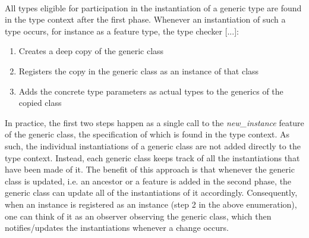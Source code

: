 \paragraph{} All types eligible for participation in the instantiation of a generic type are found in the type context after the first phase. Whenever an instantiation of such a type occurs, for instance as a feature type, the type checker [...]:
\begin{enumerate}
\item Creates a deep copy of the generic class
\item Registers the copy in the generic class as an instance of that class
\item Adds the concrete type parameters as actual types to the generics of the copied class
\end{enumerate}
In practice, the first two steps happen as a single call to the \textit{new\_instance} feature of the generic class, the specification of which is found in the type context. As such, the individual instantiations of a generic class are not added directly to the type context. Instead, each generic class keeps track of all the instantiations that have been made of it. The benefit of this approach is that whenever the generic class is updated, i.e. an ancestor or a feature is added in the second phase, the generic class can update all of the instantiations of it accordingly. Consequently, when an instance is registered as an instance (step 2 in the above enumeration), one can think of it as an observer observing the generic class, which then notifies/updates the instantiations whenever a change occurs.
